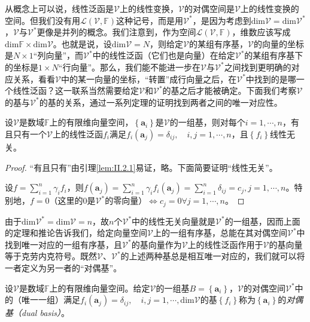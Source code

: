 \documentclass[main.tex]{subfiles}
\begin{document}
从概念上可以说，线性泛函是$\mathcal{V}$上的线性变换，$\mathcal{V}$的对偶空间是$\mathcal{V}$上的线性变换的空间。但我们没有用$\mathcal{L}\left(\mathcal{V},\mathbb{F}\right)$这种记号，而是用$\mathcal{V}^*$，是因为考虑到$\mathrm{dim}\mathcal{V}=\mathrm{dim}\mathcal{V}^*$，$\mathcal{V}$与$\mathcal{V}^*$更像是并列的概念。我们注意到，作为空间$\mathcal{L}\left(\mathcal{V},\mathbb{F}\right)$，维数应该写成$\mathrm{dim}\mathbb{F}\times\mathrm{dim}\mathbb{\mathcal{V}}$。也就是说，设$\mathrm{dim}\mathcal{V}=N$，则给定$\mathcal{V}$的某组有序基，$\mathcal{V}$的向量的坐标是$N\times 1$“列向量”，而$\mathcal{V}^*$中的线性泛函（它们也是向量）在给定$\mathcal{V}^*$的某组有序基下的坐标是$1\times N$“行向量”。那么，我们能不能进一步在$\mathcal{V}$与$\mathcal{V}^*$之间找到更明确的对应关系，看看$\mathcal{V}$中的某一向量的坐标，“转置”成行向量之后，在$\mathcal{V}^*$中找到的是哪一个线性泛函？这一联系当然需要给定$\mathcal{V}$和$\mathcal{V}^*$的基之后才能被确定。下面我们考察$\mathcal{V}$的基与$\mathcal{V}^*$的基的关系，通过一系列定理的证明找到两者之间的唯一对应性。

\begin{theorem}\label{thm:II.2.18}
    设$\mathcal{V}$是数域$\mathbb{F}$上的有限维向量空间，$\left\{\mathbf{a}_i\right\}$是$\mathcal{V}$的一组基，则对每个$i=1,\cdots,n$，有且只有一个$\mathcal{V}$上的线性泛函$f_i$满足$f_i\left(\mathbf{a}_j\right)=\delta_{ij},\quad i,j=1,\cdots,n$，且$\left\{f_i\right\}$线性无关。
\end{theorem}
\begin{proof}
    “有且只有”由引理\ref{lem:II.2.1}易证，略。下面简要证明“线性无关”。

    设$f=\sum_{i=1}^n\gamma_if_i$，则$f\left(\mathbf{a}_j\right)=\sum_{i=1}^n\gamma_if_i\left(\mathbf{a}_j\right)=\sum_{i=1}^n\delta_{ij}=c_j,j=1,\cdots,n$。特别地，$f=0$（这里的$0$是$\mathcal{V}^*$的零向量）$\Leftrightarrow c_j=0\forall j=1,\cdots,n$。
\end{proof}

由于$\mathrm{dim}\mathcal{V}^*=\mathrm{dim}\mathcal{V}=n$，故$n$个$\mathcal{V}^*$中的线性无关向量就是$\mathcal{V}^*$的一组基，因而上面的定理和推论告诉我们，给定向量空间$\mathcal{V}$上的一组有序基，总能在其对偶空间$\mathcal{V}^*$中找到唯一对应的一组有序基，且$\mathcal{V}^*$的基向量作为$\mathcal{V}$上的线性泛函作用于$\mathcal{V}$的基向量等于克劳内克符号。既然$\mathcal{V}$、$\mathcal{V}^*$的上述两种基总是相互唯一对应的，我们就可以将一者定义为另一者的“对偶基”。

\begin{definition}[对偶基]\label{def:II.2.15}
    设$\mathcal{V}$是数域$\mathbb{F}$上的有限维向量空间。给定$\mathcal{V}$的一组基$B=\left\{\mathbf{a}_i\right\}$，$\mathcal{V}$的对偶空间$\mathcal{V}^*$中的（唯一一组）满足$f_i\left(\mathbf{a}_j\right)=\delta_{ij},\quad i,j=1,\cdots,\mathrm{dim}\mathcal{V}$的基$\left\{f_i\right\}$称为$\left\{\mathbf{a}_i\right\}$的\emph{对偶基（dual basis）}。
\end{definition}
\end{document}
